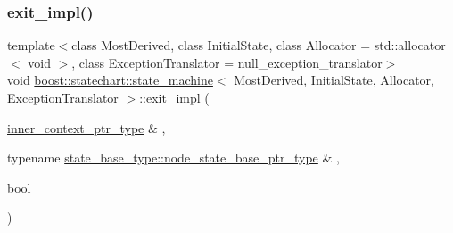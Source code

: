 \mbox{\label{classboost_1_1statechart_1_1state__machine_a9486745c6ec90b852dc30c3bbcade535}} 
\subsubsection{\texorpdfstring{exit\+\_\+impl()}{exit\_impl()}}
{\footnotesize\ttfamily template$<$class Most\+Derived, class Initial\+State, class Allocator = std\+::allocator$<$ void $>$, class Exception\+Translator = null\+\_\+exception\+\_\+translator$>$ \\
void \mbox{\hyperlink{classboost_1_1statechart_1_1state__machine}{boost\+::statechart\+::state\+\_\+machine}}$<$ Most\+Derived, Initial\+State, Allocator, Exception\+Translator $>$\+::exit\+\_\+impl (\begin{DoxyParamCaption}\item[{\mbox{\hyperlink{classboost_1_1statechart_1_1state__machine_a9943ccf227161502104d8843521b6131}{inner\+\_\+context\+\_\+ptr\+\_\+type}} \&}]{,  }\item[{typename \mbox{\hyperlink{classboost_1_1statechart_1_1detail_1_1state__base_a8e3dd0f80bf95d7df21417a50f1dbaa1}{state\+\_\+base\+\_\+type\+::node\+\_\+state\+\_\+base\+\_\+ptr\+\_\+type}} \&}]{,  }\item[{bool}]{ }\end{DoxyParamCaption})\hspace{0.3cm}{\ttfamily [inline]}}

\mbox{\label{classboost_1_1statechart_1_1state__machine_a870e55352a7a01e7224ae0f06f89b0e9}} 
